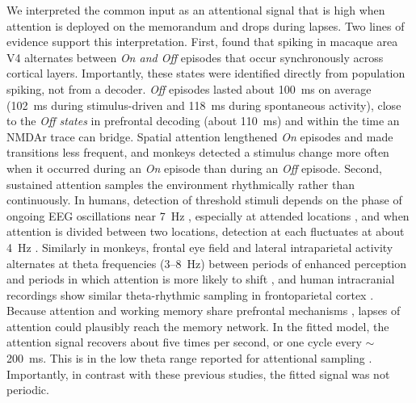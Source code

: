 \documentclass[11pt]{article}
\begin{document}
We interpreted the common input as an attentional signal that is high when attention is deployed on the memorandum and drops during lapses. Two lines of evidence support this interpretation. First, \citet{engel2016} found that spiking in macaque area V4 alternates between \emph{On and Off} episodes that occur synchronously across cortical layers. Importantly, these states were identified directly from population spiking, not from a decoder. \emph{Off} episodes lasted about 100~ms on average (102~ms during stimulus-driven and 118~ms during spontaneous activity), close to the \emph{Off states} in prefrontal decoding (about 110~ms) and within the time an NMDAr trace can bridge. Spatial attention lengthened \emph{On} episodes and made transitions less frequent, and monkeys detected a stimulus change more often when it occurred during an \emph{On} episode than during an \emph{Off} episode. Second, sustained attention samples the environment rhythmically rather than continuously. In humans, detection of threshold stimuli depends on the phase of ongoing EEG oscillations near 7~Hz \citep{busch2009}, especially at attended locations \citep{busch2010}, and when attention is divided between two locations, detection at each fluctuates at about 4~Hz \citep{landau2012}. Similarly in monkeys, frontal eye field and lateral intraparietal activity alternates at theta frequencies (3--8~Hz) between periods of enhanced perception and periods in which attention is more likely to shift \citep{fiebelkorn2018}, and human intracranial recordings show similar theta-rhythmic sampling in frontoparietal cortex \citep{helfrich2018}. Because attention and working memory share prefrontal mechanisms \citep{awh2001,panichello2021}, lapses of attention could plausibly reach the memory network. In the fitted model, the attention signal recovers about five times per second, or one cycle every $\sim$200~ms. This is in the low theta range reported for attentional sampling \citep{landau2012,fiebelkorn2018,helfrich2018}. Importantly, in contrast with these previous studies, the fitted signal was not periodic.
\end{document}
